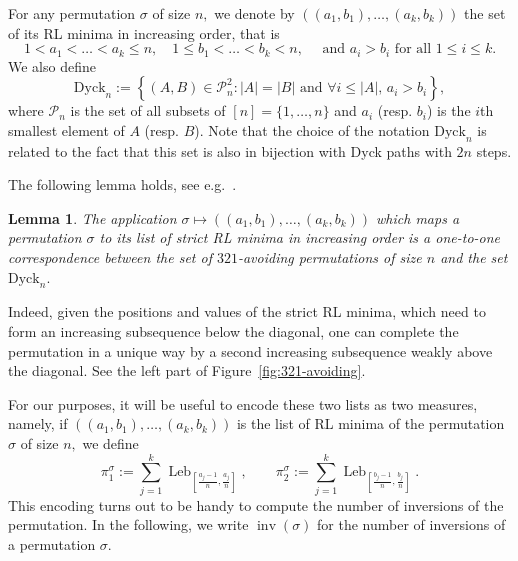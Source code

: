 \documentclass[a4paper,11pt]{amsart}
\DeclareMathOperator{\Leb}{Leb}
\DeclareMathOperator{\inv}{inv}
\newtheorem{lem}[thm]{Lemma}
\theoremstyle{definition}
\begin{document}
For any permutation $\sigma$ of size $n,$ we denote by  $((a_1,b_1), \dots, (a_k,b_k))$  the set of its RL minima in increasing order,
that is
\begin{equation}\label{eq:condition_AB}
	1 <  a_1 < \dots <a_k \le n,
	\quad
	1 \le  b_1 < \dots <b_k < n,
	\quad\text{ and } a_i >b_i\text{ for all }1\le i \le k.
	\end{equation}
We also define
\[
\textrm{Dyck}_{n}:= \left\{(A,B)\in \mathcal P_n^2 : |A|=|B| \textrm{ and } \forall i \le |A|, \, a_i >b_i \right\},
\]
where $\mathcal P_n$ is the set of all subsets of $[n]= \{1, \ldots , n\}$ and $a_i$ (resp. $b_i$) is the $i$th smallest element of $A$ (resp. $B$).
Note that the choice of the notation $\textrm{Dyck}_{n}$ is related to the fact that this set is also in bijection with Dyck paths with $2n$ steps.

The following lemma holds, see e.g.~\cite[Section 4]{callan2007bijectionsdyckpaths321avoiding}.
\begin{lem}\label{lem:bij321}
	The application $\sigma \mapsto ((a_1,b_1), \dots, (a_k,b_k))$ which maps a permutation $\sigma$ to its list of strict RL minima in increasing order is a one-to-one correspondence between the set of  $321$-avoiding permutations of size $n$ and the set $\textrm{Dyck}_{n}.$
\end{lem}
Indeed, given the positions and values of the strict RL minima, which need to form an increasing
subsequence below the diagonal, one can complete the permutation
in a unique way by a second increasing subsequence weakly above the diagonal.
See the left part of Figure~\ref{fig:321-avoiding}.

For our purposes, it will be useful to encode these two lists as two measures, namely, if $((a_1,b_1), \dots, (a_k,b_k))$ is the list of  RL minima of the permutation $\sigma$ of size $n,$ we define
\[\pi_1^\sigma :=  \sum_{j=1}^k \Leb_{\left[\frac{a_j-1}n, \frac{a_j}n\right]} ,\qquad
\pi_2^\sigma :=  \sum_{j=1}^k \Leb_{\left[\frac{b_j-1}n, \frac{b_j}n\right]} .\]
This encoding turns out to be handy to compute the number of inversions of the permutation.
In the following, we write $\inv(\sigma)$ for the number of inversions of a permutation $\sigma$.
\end{document}
